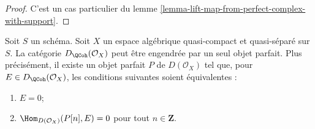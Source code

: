 \begin{proof}
C'est un cas particulier du lemme
\ref{lemma-lift-map-from-perfect-complex-with-support}.
\end{proof}

\begin{theorem}
\label{theorem-bondal-van-den-Bergh}
Soit $S$ un sch\'ema. Soit $X$ un espace alg\'ebrique quasi-compact et
quasi-s\'epar\'e sur $S$. La cat\'egorie $D_\QCoh(\mathcal{O}_X)$ peut \^etre
engendr\'ee par un seul objet parfait. Plus pr\'ecis\'ement, il existe un objet
parfait $P$ de $D(\mathcal{O}_X)$ tel que, pour
$E\in D_\QCoh(\mathcal{O}_X)$, les conditions suivantes soient \'equivalentes :
\begin{enumerate}
\item $E = 0$;
\item $\Hom_{D(\mathcal{O}_X)}(P[n], E) = 0$ pour tout $n \in \mathbf{Z}$.
\end{enumerate}
\end{theorem}

